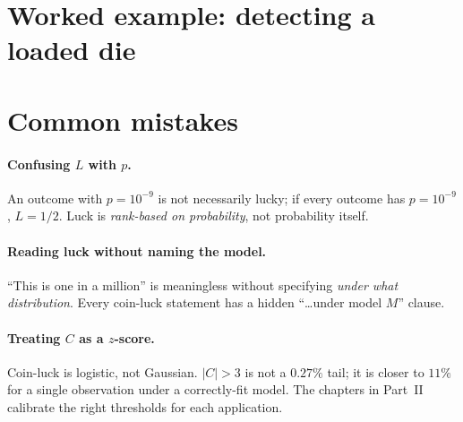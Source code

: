 \section{Worked example: detecting a loaded die}

\section{Common mistakes}

\paragraph{Confusing $L$ with $p$.}  An outcome with $p = 10^{-9}$ is not
necessarily lucky; if every outcome has $p = 10^{-9}$, $L = 1/2$.  Luck is
\emph{rank-based on probability}, not probability itself.

\paragraph{Reading luck without naming the model.}  ``This is one in a
million'' is meaningless without specifying \emph{under what
distribution}.  Every coin-luck statement has a hidden ``\dots under model
$M$'' clause.

\paragraph{Treating $C$ as a $z$-score.}  Coin-luck is logistic, not
Gaussian.  $|C| > 3$ is not a $0.27\%$ tail; it is closer to $11\%$ for a
single observation under a correctly-fit model.  The chapters in
Part~II calibrate the right thresholds for each application.
